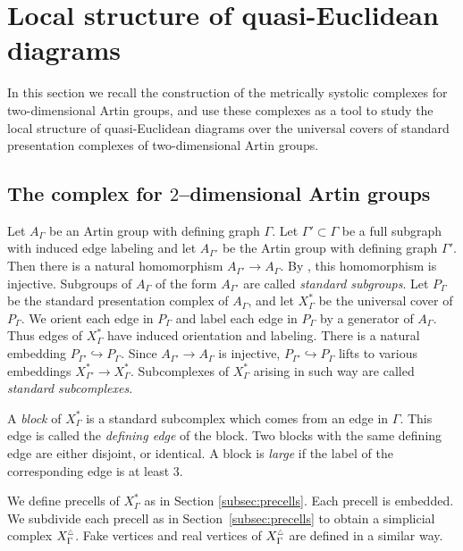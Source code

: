 \documentclass[11pt]{amsart}
\theoremstyle{definition}
\newcommand{\Xb}{X^{\scalebox{0.53}{$\triangle$}}}
\begin{document}
\section{Local structure of quasi-Euclidean diagrams}
\label{sec:local flatness}
In this section we recall the construction of the metrically systolic complexes for two-dimensional Artin groups, and use these complexes as a tool to study the local structure of quasi-Euclidean diagrams over the universal covers of standard presentation complexes of two-dimensional Artin groups.

\subsection{The complex for $2$--dimensional Artin groups}
\label{s:general}
Let $A_\Gamma$ be an Artin group with defining graph $\Gamma$. Let $\Gamma'\subset\Gamma$ be a full subgraph with induced edge labeling and let $A_{\Gamma'}$ be the Artin group with defining graph $\Gamma'$. Then there is a natural homomorphism $A_{\Gamma'}\to A_{\Gamma}$. By \cite{lek}, this homomorphism is injective. Subgroups of $A_{\Gamma}$ of the form $A_{\Gamma'}$ are called \emph{standard subgroups}. Let $P_{\Gamma}$ be the standard presentation complex of $A_{\Gamma}$, and let $X^{\ast}_{\Gamma}$ be the universal cover of $P_{\Gamma}$. We orient each edge in $P_{\Gamma}$ and label each edge in $P_{\Gamma}$ by a generator of $A_\Gamma$. Thus edges of $X^{\ast}_{\Gamma}$ have induced orientation and labeling. There is a natural embedding $P_{\Gamma'}\hookrightarrow P_\Gamma$. Since $A_{\Gamma'}\to A_{\Gamma}$ is injective, $P_{\Gamma'}\hookrightarrow P_\Gamma$ lifts to various embeddings $X^{\ast}_{\Gamma'}\to X^{\ast}_{\Gamma}$. Subcomplexes of $X^{\ast}_{\Gamma}$ arising in such way are called \emph{standard subcomplexes}.

A \emph{block} of $X^{\ast}_{\Gamma}$ is a standard subcomplex which comes from an edge in $\Gamma$. This edge is called the \emph{defining edge} of the block. Two blocks with the same defining edge are either disjoint, or identical. A block is \emph{large} if the label of the corresponding edge is at least $3$.

We define precells of $X^{\ast}_{\Gamma}$ as in Section \ref{subsec:precells}. Each precell is embedded. We subdivide each precell as in Section~\ref{subsec:precells} to obtain a simplicial complex $\Xb_\Gamma$. Fake vertices and real vertices of $\Xb_{\Gamma}$ are defined in a similar way.
\end{document}
